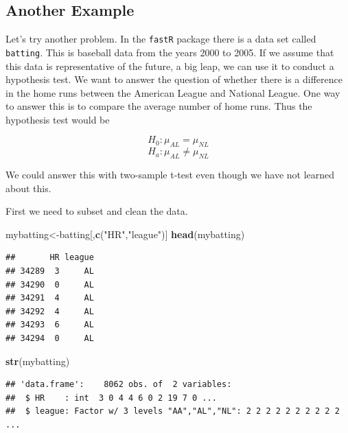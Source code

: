\documentclass[]{book}
\newenvironment{Shaded}{\begin{snugshade}}{\end{snugshade}}
\newcommand{\KeywordTok}[1]{\textcolor[rgb]{0.13,0.29,0.53}{\textbf{#1}}}
\newcommand{\StringTok}[1]{\textcolor[rgb]{0.31,0.60,0.02}{#1}}
\newcommand{\OperatorTok}[1]{\textcolor[rgb]{0.81,0.36,0.00}{\textbf{#1}}}
\newcommand{\NormalTok}[1]{#1}
\theoremstyle{definition}
\theoremstyle{definition}
\theoremstyle{definition}
\theoremstyle{remark}
\begin{document}
\subsection{Another Example}\label{another-example}

Let's try another problem. In the \texttt{fastR} package there is a data
set called \texttt{batting}. This is baseball data from the years 2000
to 2005. If we assume that this data is representative of the future, a
big leap, we can use it to conduct a hypothesis test. We want to answer
the question of whether there is a difference in the home runs between
the American League and National League. One way to answer this is to
compare the average number of home runs. Thus the hypothesis test would
be

\[H_{0}: \mu_{AL}=\mu_{NL}\] \[H_{a}: \mu_{AL} \neq \mu_{NL}\]

We could answer this with two-sample t-test even though we have not
learned about this.

First we need to subset and clean the data.

\begin{Shaded}
\begin{Highlighting}[]
\NormalTok{mybatting<-batting[,}\KeywordTok{c}\NormalTok{(}\StringTok{"HR"}\NormalTok{,}\StringTok{"league"}\NormalTok{)]}
\KeywordTok{head}\NormalTok{(mybatting)}
\end{Highlighting}
\end{Shaded}

\begin{verbatim}
##       HR league
## 34289  3     AL
## 34290  0     AL
## 34291  4     AL
## 34292  4     AL
## 34293  6     AL
## 34294  0     AL
\end{verbatim}

\begin{Shaded}
\begin{Highlighting}[]
\KeywordTok{str}\NormalTok{(mybatting)}
\end{Highlighting}
\end{Shaded}

\begin{verbatim}
## 'data.frame':    8062 obs. of  2 variables:
##  $ HR    : int  3 0 4 4 6 0 2 19 7 0 ...
##  $ league: Factor w/ 3 levels "AA","AL","NL": 2 2 2 2 2 2 2 2 2 2 ...
\end{verbatim}

\begin{Shaded}
\end{Shaded}
\end{document}
